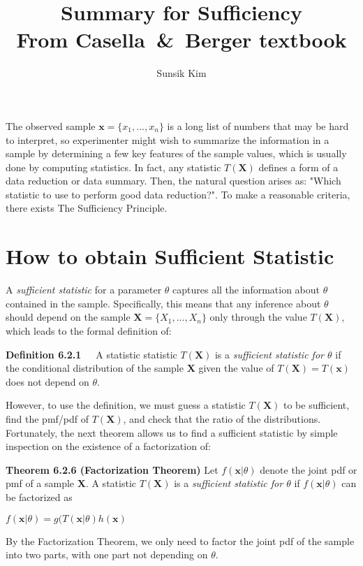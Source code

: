\documentclass[10pt]{article}
\title{%
Summary for Sufficiency \\
\large{From Casella\ \&\ Berger textbook}}
\author{Sunsik Kim}
\date{}
\begin{document}
\maketitle

\noindent The observed sample $\textbf{x}=\{x_1,...,x_n\}$ is a long list of numbers that may be hard to interpret, so experimenter might wish to summarize the information in a sample by determining a few key features of the sample values, which is usually done by computing statistics. In fact, any statistic $T(\textbf{X})$ defines a form of a data reduction or data summary. Then, the natural question arises as: "Which statistic to use to perform good data reduction?". To make a reasonable criteria, there exists The Sufficiency Principle.

\section{How to obtain Sufficient Statistic}
A \textit{sufficient statistic} for a parameter $\theta$ captures all the information about $\theta$ contained in the sample. Specifically, this means that any inference about $\theta$ should depend on the sample $\textbf{X}=\{X_1,...,X_n\}$ only through the value $T(\textbf{X})$, which leads to the formal definition of:\bigskip

\textbf{Definition 6.2.1}\ \ \ A statistic statistic $T(\textbf{X})$ is a \textit{sufficient statistic for $\theta$} if the conditional distribution of the sample \textbf{X} given the value of $T(\textbf{X})=T(\textbf{x})$ does not depend on $\theta$.\bigskip

\noindent However, to use the definition, we must guess a statistic $T(\textbf{X})$ to be sufficient, find the pmf/pdf of $T(\textbf{X})$, and check that the ratio of the distributions. Fortunately, the next theorem allows us to find a sufficient statistic by simple inspection on the existence of a factorization of:\bigskip

\textbf{Theorem 6.2.6 (Factorization Theorem)} Let $f(\textbf{x}|\theta)$ denote the joint pdf or pmf of a sample \textbf{X}. A statistic $T(\textbf{X})$ is a \textit{sufficient statistic for $\theta$} if $f(\textbf{x}|\theta)$ can be factorized as
\begin{center}
    $f(\textbf{x}|\theta)=g(T(\textbf{x}|\theta)h(\textbf{x})$
\end{center}
By the Factorization Theorem, we only need to factor the joint pdf of the sample into two parts, with one part not depending on $\theta$.
\end{document}
